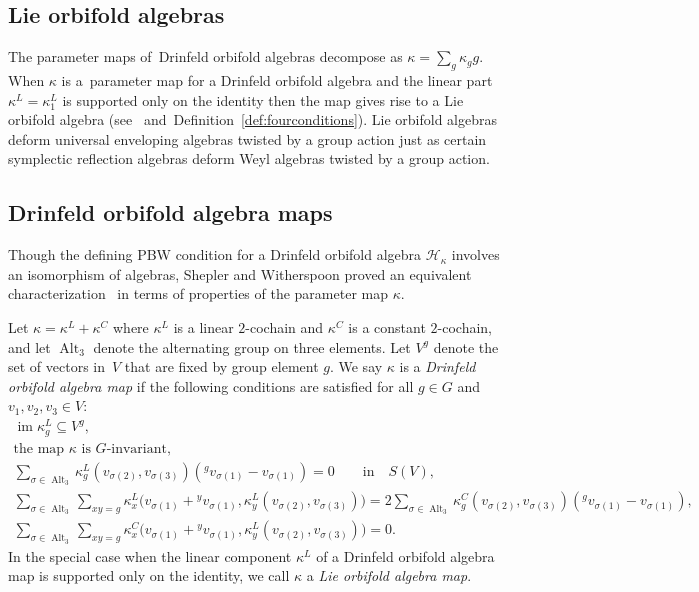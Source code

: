 \documentclass[pdftex]{sigma}
\numberwithin{equation}{section}
\newcommand{\actby}[1]{{}^{#1}}
\DeclareMathOperator{\Alt}{Alt}
\DeclareMathOperator{\im}{im}
\begin{document}
\subsection{Lie orbifold algebras}%
The parameter maps of~Drinfeld orbifold algebras decompose as
$\kappa=\sum_{g} \kappa_g g$. When $\kappa$ is a~para\-meter map for a Drinfeld orbifold algebra and the linear part $\kappa^L=\kappa^L_1$
is supported only on the identity then the map gives rise to a Lie orbifold algebra
(see~\cite[Section~4]{SWorbifold} and~Definition~\ref{def:fourconditions}).
Lie orbifold algebras deform universal enveloping
algebras twisted by a group action just as certain symplectic reflection algebras
deform Weyl algebras twisted by a group action.

\subsection{Drinfeld orbifold algebra maps}
Though the defining PBW condition for a Drinfeld orbifold algebra $\mathcal{H}_{\kappa}$ involves an isomorphism of algebras, Shepler and Witherspoon proved an equivalent characterization~\cite[Theorem~3.1]{SWorbifold} in terms of properties of the parameter map $\kappa$.

\begin{Definition}\label{def:fourconditions}
	Let $\kappa=\kappa^L+\kappa^C$ where $\kappa^L$ is a linear $2$-cochain and $\kappa^C$ is a constant $2$-cochain, and let $\Alt_3$ denote the alternating group on three elements. Let $V^g$ denote the set of vectors in~$V$ that are fixed by group element $g$.
	We say $\kappa$ is a {\it Drinfeld orbifold algebra map} if the following conditions are satisfied for all $g\in G$ and $v_1,v_2,v_3\in V$:
\begin{gather}
\label{PBWconditions-0}
\im\kappa^L_g\subseteq V^g,
\\
\label{PBWconditions-i}
\text{the map $\kappa$ is $G$-invariant,}
\\
\label{PBWconditions-ii} \sum_{\sigma\in\Alt_3}\kappa^L_g(v_{\sigma(2)},v_{\sigma(3)})(\actby{g}v_{\sigma(1)}-v_{\sigma(1)})=0\qquad
\text{in}\quad S(V),
\\
\label{PBWconditions-iii}
\sum_{\sigma\in\Alt_3}\sum_{xy=g}
\kappa^L_x\big(v_{\sigma(1)}+\actby{y}v_{\sigma(1)},\kappa^L_y(v_{\sigma(2)},v_{\sigma(3)})\big) =2\!\!\sum_{\sigma\in\Alt_3}\!\kappa^C_g(v_{\sigma(2)},v_{\sigma(3)})(\actby{g}v_{\sigma(1)}-v_{\sigma(1)}),
\\
\label{PBWconditions-iv}
\sum_{\sigma\in\Alt_3}\sum_{xy=g}
\kappa^C_x\big(v_{\sigma(1)}+\actby{y}v_{\sigma(1)},\kappa^L_y(v_{\sigma(2)},v_{\sigma(3)})\big)=0.
\end{gather}
In the special case when the linear component $\kappa^L$ of	a Drinfeld orbifold
algebra map is supported only on the identity, we call $\kappa$ a {\it Lie orbifold algebra map}.
\end{Definition}
\end{document}
